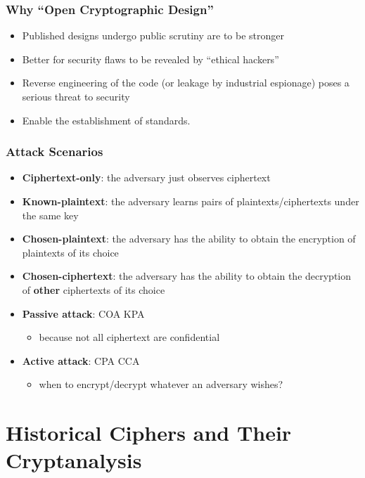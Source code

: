 \begin{frame}\frametitle{Why ``Open Cryptographic Design''}
\begin{itemize}
\item Published designs undergo public scrutiny are to be stronger
\item Better for security flaws to be revealed by ``ethical hackers''
\item Reverse engineering of the code (or leakage by industrial espionage) poses a serious threat to security
\item Enable the establishment of standards.
\end{itemize}
\end{frame}
\begin{frame}\frametitle{Attack Scenarios}	
\begin{itemize}
\item \textbf{Ciphertext-only}: the adversary just observes ciphertext
\item \textbf{Known-plaintext}: the adversary learns pairs of plaintexts/ciphertexts under the same key
\item \textbf{Chosen-plaintext}: the adversary has the ability to obtain the encryption of plaintexts of its choice
\item \textbf{Chosen-ciphertext}: the adversary has the ability to obtain the decryption of \textbf{other} ciphertexts of its choice
\item \textbf{Passive attack}: COA KPA
\begin{itemize}
\item because not all ciphertext are confidential
\end{itemize}
\item \textbf{Active attack}: CPA CCA
\begin{itemize}
\item when to encrypt/decrypt whatever an adversary wishes?
\end{itemize}
\end{itemize}	
\end{frame}
\section{Historical Ciphers and Their Cryptanalysis}
\begin{comment}
	\begin{frame}\frametitle{Why We Learn Broken Ciphers?}
	\begin{itemize}
	\item To understand the weaknesses of an ``ad-hoc'' approach
	\item To learn that ``simple'' approaches are unlikely to succeed
	\item To feel that ``we are smart enough to do some crypt-analyzing''
	\end{itemize}
	\end{frame}
\end{comment}

